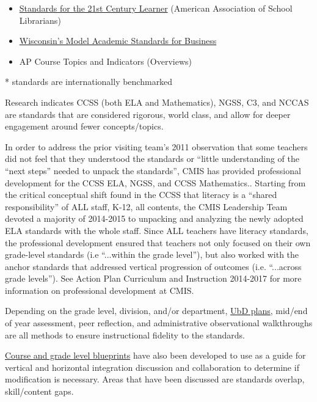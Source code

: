 \documentclass{report}
\begin{document}
\begin{findings}
\begin{itemize}
\item \href{https://drive.google.com/a/cmis.ac.th/file/d/0ByVFfrm0zfolM0VpbFNHNXlfbGs/view?usp=sharing}{Standards for the 21st Century Learner} (American Association of School Librarians)
\item \href{https://drive.google.com/a/cmis.ac.th/file/d/0ByVFfrm0zfolMTU1cXlocHR0dGs/view?usp=sharing}{Wisconsin’s Model Academic Standards for Business}  
\item AP Course Topics and Indicators  (Overviews)
\end{itemize}
* standards are internationally benchmarked 

Research indicates CCSS (both ELA and Mathematics), NGSS, C3, and NCCAS are standards that are considered rigorous, world class, and allow for deeper engagement around fewer concepts/topics.

 
In order to address the prior visiting team’s 2011 observation that some teachers did not feel that they understood the standards or “little understanding of the “next steps” needed to unpack the standards”, CMIS has provided professional development for the CCSS ELA, NGSS, and CCSS Mathematics.. Starting from the critical conceptual shift found in the CCSS that literacy is a “shared responsibility” of ALL staff, K-12, all contents, the CMIS Leadership Team devoted a majority of 2014-2015 to unpacking and analyzing the newly adopted ELA standards with the whole staff.  Since ALL teachers have literacy standards, the professional development ensured that teachers not only focused on their own grade-level standards (i.e “...within the grade level”), but also worked with the anchor standards that addressed vertical progression of outcomes (i.e. “...across grade levels”). See Action Plan Curriculum and Instruction 2014-2017 for more information on professional development at CMIS.


Depending on the grade level, division, and/or department, \href{https://docs.google.com/a/cmis.ac.th/document/d/1kL1VjwfuMMa7NaWmwUrEah1BM-jJRmLAd4VJzR3HoPs/edit?usp=sharing}{UbD plans}, mid/end of year assessment, peer reflection, and administrative observational walkthroughs are all methods to ensure instructional fidelity to the standards. 

\href{https://drive.google.com/drive/folders/0ByVFfrm0zfolfmV1QTNuWFdUVHV3dDVrRFMzUFBMazY0VGs1eWc0cmFjVGcwNDdsQkdrZzA?usp=sharing}{Course and grade level blueprints} have also been developed to use as a guide for vertical and horizontal integration discussion and collaboration to determine if modification is necessary. Areas that have been discussed are standards overlap, skill/content gaps. 


\end{findings}
\end{document}

